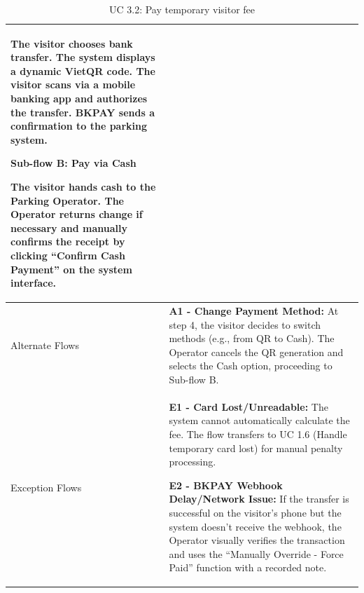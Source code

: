 \begin{table}[H]
\begin{tabularx}{\textwidth}{|>{\raggedright\arraybackslash}p{3.5cm}|>{\RaggedRight\arraybackslash}X|}
The visitor chooses bank transfer. The system displays a dynamic VietQR code. The visitor scans via a mobile banking app and authorizes the transfer. BKPAY sends a confirmation to the parking system. \par \vspace{0.5em}
\textbf{Sub-flow B: Pay via Cash} \par
The visitor hands cash to the Parking Operator. The Operator returns change if necessary and manually confirms the receipt by clicking ``Confirm Cash Payment'' on the system interface. \\
\hline
Alternate Flows & 
\textbf{A1 - Change Payment Method:} At step 4, the visitor decides to switch methods (e.g., from QR to Cash). The Operator cancels the QR generation and selects the Cash option, proceeding to Sub-flow B. \\
\hline
Exception Flows & 
\textbf{E1 - Card Lost/Unreadable:} The system cannot automatically calculate the fee. The flow transfers to UC 1.6 (Handle temporary card lost) for manual penalty processing. \par \vspace{0.5em}
\textbf{E2 - BKPAY Webhook Delay/Network Issue:} If the transfer is successful on the visitor's phone but the system doesn't receive the webhook, the Operator visually verifies the transaction and uses the ``Manually Override - Force Paid'' function with a recorded note. \\
\hline
\end{tabularx}
\caption{UC 3.2: Pay temporary visitor fee}
\label{tab:uc3.2}
\end{table}